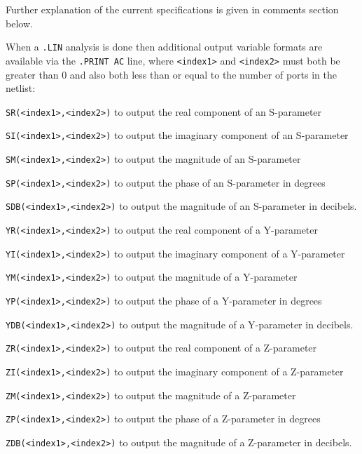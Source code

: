 \begin{Command}
\begin{Arguments}
Further explanation of the current specifications is given in comments section below.

When a \texttt{.LIN} analysis is done then additional output variable formats are available
via the \texttt{.PRINT AC} line, where \texttt{<index1>} and \texttt{<index2>} must both
be greater than 0 and also both less than or equal to the number of ports in the netlist:
\begin{XyceItemize}
\item \texttt{SR(<index1>,<index2>)} to output the real component of an S-parameter
\item \texttt{SI(<index1>,<index2>)} to output the imaginary component of an S-parameter
\item \texttt{SM(<index1>,<index2>)} to output the magnitude of an S-parameter
\item \texttt{SP(<index1>,<index2>)} to output the phase of an S-parameter in degrees
\item \texttt{SDB(<index1>,<index2>)} to output the magnitude of an S-parameter in decibels.
\item \texttt{YR(<index1>,<index2>)} to output the real component of a Y-parameter
\item \texttt{YI(<index1>,<index2>)} to output the imaginary component of a Y-parameter
\item \texttt{YM(<index1>,<index2>)} to output the magnitude of a Y-parameter
\item \texttt{YP(<index1>,<index2>)} to output the phase of a Y-parameter in degrees
\item \texttt{YDB(<index1>,<index2>)} to output the magnitude of a Y-parameter in decibels.
\item \texttt{ZR(<index1>,<index2>)} to output the real component of a Z-parameter
\item \texttt{ZI(<index1>,<index2>)} to output the imaginary component of a Z-parameter
\item \texttt{ZM(<index1>,<index2>)} to output the magnitude of a Z-parameter
\item \texttt{ZP(<index1>,<index2>)} to output the phase of a Z-parameter in degrees
\item \texttt{ZDB(<index1>,<index2>)} to output the magnitude of a Z-parameter in decibels.
\end{XyceItemize}


\end{Arguments}
\end{Command}
